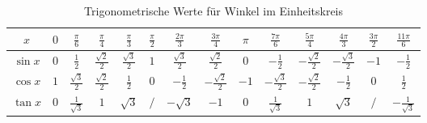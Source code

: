 \begin{table}[h!]
\renewcommand{\arraystretch}{1.5}
\centering
\caption{Trigonometrische Werte für Winkel im Einheitskreis}
\begin{tabular}{c|c c c c c c c c c c c c c}
$x$ & $0$ & $\frac{\pi}{6}$ & $\frac{\pi}{4}$ & $\frac{\pi}{3}$ & $\frac{\pi}{2}$ & $\frac{2\pi}{3}$ & $\frac{3\pi}{4}$ & $\pi$ & $\frac{7\pi}{6}$ & $\frac{5\pi}{4}$ & $\frac{4\pi}{3}$ & $\frac{3\pi}{2}$ & $\frac{11\pi}{6}$ \\ \hline
$\sin x$ & $0$ & $\frac{1}{2}$ & $\frac{\sqrt{2}}{2}$ & $\frac{\sqrt{3}}{2}$ & $1$ & $\frac{\sqrt{3}}{2}$ & $\frac{\sqrt{2}}{2}$ & $0$ & $-\frac{1}{2}$ & $-\frac{\sqrt{2}}{2}$ & $-\frac{\sqrt{3}}{2}$ & $-1$ & $-\frac{1}{2}$ \\ 
$\cos x$ & $1$ & $\frac{\sqrt{3}}{2}$ & $\frac{\sqrt{2}}{2}$ & $\frac{1}{2}$ & $0$ & $-\frac{1}{2}$ & $-\frac{\sqrt{2}}{2}$ & $-1$ & $-\frac{\sqrt{3}}{2}$ & $-\frac{\sqrt{2}}{2}$ & $-\frac{1}{2}$ & $0$ & $\frac{1}{2}$ \\ 
$\tan x$ & $0$ & $\frac{1}{\sqrt{3}}$ & $1$ & $\sqrt{3}$ & $ / $ & $-\sqrt{3}$ & $-1$ & $0$ & $\frac{1}{\sqrt{3}}$ & $1$ & $\sqrt{3}$ & $ / $ & $-\frac{1}{\sqrt{3}}$ \\
\end{tabular}
\label{tab:trig}
\end{table}
